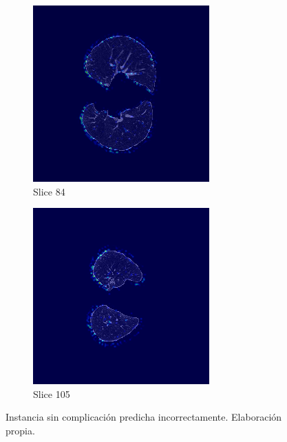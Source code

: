 \begin{figure}[!htbp]
\vspace{0.5cm}

\begin{subfigure}[b]{0.45\textwidth}
    \includegraphics[width=\textwidth]{img/label0_fallo_pred1_pid32HENX_slice_84.png}
    \caption{Slice 84}
\end{subfigure}
\hfill
\begin{subfigure}[b]{0.45\textwidth}
    \includegraphics[width=\textwidth]{img/label0_fallo_pred1_pid32HENX_slice_105.png}
    \caption{Slice 105}
\end{subfigure}

\caption{Instancia sin complicación predicha incorrectamente. Elaboración propia. }
\label{fig:label0-incorrecta}
\end{figure}


